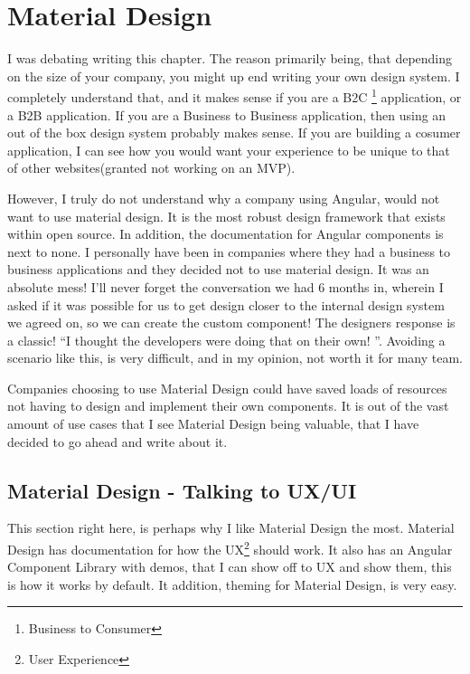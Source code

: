 \maketitle{}
\section{ Material Design }

I was debating writing this chapter. The reason primarily being, that depending
on the size of your company, you might up end writing your own design system. I
completely understand that, and it makes sense if you are a B2C
\footnote{Business to Consumer} application, or a B2B application. If you are a
Business to Business application, then using an out of the box design system
probably makes sense. If you are building a cosumer application, I can see how
you would want your experience to be unique to that of other websites(granted
not working on an MVP).

However, I truly do not understand why a company using Angular, would not want
to use material design. It is the most robust design framework that exists
within open source. In addition, the documentation for Angular components is
next to none. I personally have been in companies where they had a business
to business applications and they decided not to use material design. It was an
absolute mess! I'll never forget the conversation we had 6 months in, wherein I
asked if it was possible for us to get design closer to the internal design
system we agreed on, so we can create the custom component! The designers
response is a classic! ``I thought the developers were doing that on their own!
''. Avoiding a scenario like this, is very difficult, and in my opinion, not
worth it for many team.

Companies choosing to use Material Design could have saved loads of resources
not having to design and implement their own components. It is out of the vast
amount of use cases that I see Material Design being valuable, that I have
decided to go ahead and write about it.

\subsection{ Material Design - Talking to UX/UI }
This section right here, is perhaps why I like Material Design the most.
Material Design has documentation for how the UX\footnote{User Experience}
should work. It also has an Angular Component Library with demos, that I can
show off to UX and show them, this is how it works by default. It addition,
theming for Material Design, is very easy.

